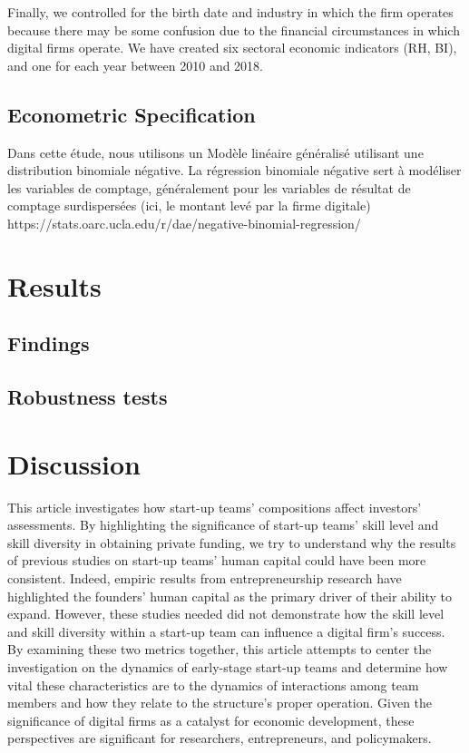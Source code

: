 \documentclass[12pt]{article}
\begin{document}
Finally, we controlled for the birth date and industry in which the firm operates because there may be some confusion due to the financial circumstances in which digital firms operate. We have created six sectoral economic indicators (RH, BI), and one for each year between 2010 and 2018.

\subsection{Econometric Specification}

Dans cette étude, nous utilisons un Modèle linéaire généralisé utilisant une distribution binomiale négative. La régression binomiale négative sert à modéliser les variables de comptage, généralement pour les variables de résultat de comptage surdispersées (ici, le montant levé par la firme digitale) https://stats.oarc.ucla.edu/r/dae/negative-binomial-regression/

\section{Results}

\subsection{Findings}


\subsection{Robustness tests}


\section{Discussion}

This article investigates how start-up teams' compositions affect investors' assessments. By highlighting the significance of start-up teams' skill level and skill diversity in obtaining private funding, we try to understand why the results of previous studies on start-up teams' human capital could have been more consistent. Indeed, empiric results from entrepreneurship research have highlighted the founders' human capital as the primary driver of their ability to expand. However, these studies needed did not demonstrate how the skill level and skill diversity within a start-up team can influence a digital firm's success. By examining these two metrics together, this article attempts to center the investigation on the dynamics of early-stage start-up teams and determine how vital these characteristics are to the dynamics of interactions among team members and how they relate to the structure's proper operation. Given the significance of digital firms as a catalyst for economic development, these perspectives are significant for researchers, entrepreneurs, and policymakers.
\end{document}
